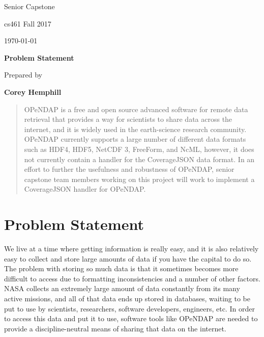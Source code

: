 \documentclass[letterpaper,10pt,draftclsnofoot,onecolumn]{IEEEtran}
\def \Author{Corey Hemphill}
\def \Assignment{Problem Statement}
\def \DocType{	%
		Senior Capstone
		}
\begin{document}
\begin{titlepage}
    \begin{singlespace}
        \hfill  
        \par\vspace{.2in}
        \centering
        \scshape{
            \huge  \DocType \par
           	\huge cs461 Fall 2017 \par
            {\large\today}\par
            \vspace{.5in}
            \textbf{\Huge\Assignment}\par
            \vspace{.5in}
            {\large Prepared by }\par
           	\textbf{\Author}\par
            \vspace{5pt}
            }
            \vspace{120pt}
        \begin{abstract}
        OPeNDAP is a free and open source advanced software for remote data retrieval that
		provides a way for scientists to share data across the internet, and it is widely
		used in the earth-science research community. OPeNDAP currently supports a large
		number of different data formats such as HDF4, HDF5, NetCDF 3, FreeForm,
		and NcML, however, it does not currently contain a handler for the CoverageJSON
		data format. In an effort to further the usefulness and robustness of OPeNDAP,
		senior capstone team members working on this project will work to implement a
		CoverageJSON handler for OPeNDAP.
        \end{abstract} 
    \end{singlespace}
\end{titlepage}
\newpage
\section{Problem Statement}
We live at a time where getting information is really easy, and it is also relatively easy to collect and store large amounts of data if you have the capital to do so. The problem with storing so much data is that it sometimes becomes more difficult to access due to formatting inconsistencies and a number of other factors. NASA collects an extremely large amount of data constantly from its many active missions, and all of that data ends up stored in databases, waiting to be put to use by scientists, researchers, software developers, engineers, etc. In order to access this data and put it to use, software tools like OPeNDAP are needed to provide a discipline-neutral means of sharing that data on the internet.
\end{document}
